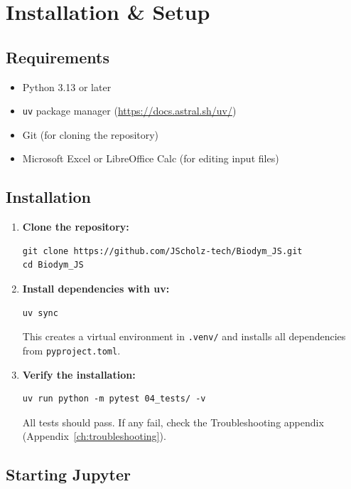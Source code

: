\chapter{Installation \& Setup}
\label{ch:installation}

\section{Requirements}

\begin{itemize}
  \item Python 3.13 or later
  \item \texttt{uv} package manager (\url{https://docs.astral.sh/uv/})
  \item Git (for cloning the repository)
  \item Microsoft Excel or LibreOffice Calc (for editing input files)
\end{itemize}

\section{Installation}

\begin{enumerate}
  \item \textbf{Clone the repository:}
\begin{lstlisting}[style=bash]
git clone https://github.com/JScholz-tech/Biodym_JS.git
cd Biodym_JS
\end{lstlisting}

  \item \textbf{Install dependencies with uv:}
\begin{lstlisting}[style=bash]
uv sync
\end{lstlisting}

This creates a virtual environment in \texttt{.venv/} and installs all dependencies from \texttt{pyproject.toml}.

  \item \textbf{Verify the installation:}
\begin{lstlisting}[style=bash]
uv run python -m pytest 04_tests/ -v
\end{lstlisting}

All tests should pass. If any fail, check the Troubleshooting appendix (Appendix~\ref{ch:troubleshooting}).
\end{enumerate}

\section{Starting Jupyter}

